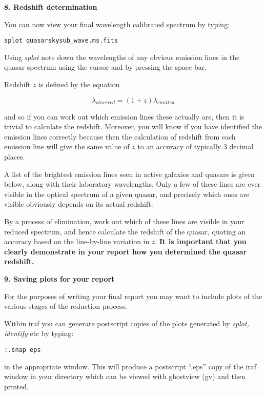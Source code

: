 {\large {\bf 8. Redshift determination}}

You can now view your final wavelength calibrated spectrum by typing:

{\tt splot \verb,quasarskysub_wave.ms.fits,}

Using {\it splot} note down the wavelengths of any obvious emission
lines in the quasar spectrum using the cursor and by pressing the space bar.

\bigskip

Redshift $z$ is defined by the equation

$$\lambda_{observed} = (1 + z) \lambda_{emitted}$$

and so if you can work out which emission lines these actually are, then
it is trivial to calculate the redshift. Moreover, you will know if
you have identified the emission lines correctly because then 
the calculation of redshift from each emission line will give the same
value of $z$ to an accuracy of typically 3 decimal places.

A list of the brightest emission lines seen in active galaxies and
quasars is given below, along with their laboratory wavelengths. 
Only a few of these lines are ever visible in the optical spectrum of a given quasar, and
precisely which ones are visible obviously depends on its actual redshift.
 
By a process of elimination, work out which of these lines are visible in
your reduced spectrum, and hence calculate the redshift of the quasar,
quoting an accuracy based on the line-by-line variation in $z$. {\bf It is important that
you clearly demonstrate in your report how you determined the quasar redshift.}

{\large {\bf 9. Saving plots for your report}}

For the purposes of writing your final report you may want to include
plots of the various stages of the reduction process.

Within {\sc iraf} you can generate
postscript copies of the plots generated by {\it splot, identify} etc
by typing:

{\tt :.snap eps}

in the appropriate window. This will produce a postscript ``.eps''
copy of the {\sc iraf} window in your directory which can be viewed
with ghostview (gv) and then printed.


